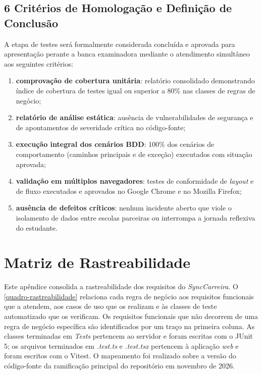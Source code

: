 \begin{apendicesenv}
\section*{6 Critérios de Homologação e Definição de Conclusão}

A etapa de testes será formalmente considerada concluída e aprovada para apresentação perante a banca examinadora mediante o atendimento simultâneo aos seguintes critérios:

\begin{enumerate}[label=\arabic*.]
  \item \textbf{comprovação de cobertura unitária}: relatório consolidado demonstrando índice de cobertura de testes igual ou superior a 80\% nas classes de regras de negócio;
  \item \textbf{relatório de análise estática}: ausência de vulnerabilidades de segurança e de apontamentos de severidade crítica no código-fonte;
  \item \textbf{execução integral dos cenários BDD}: 100\% dos cenários de comportamento (caminhos principais e de exceção) executados com situação aprovada;
  \item \textbf{validação em múltiplos navegadores}: testes de conformidade de \textit{layout} e de fluxo executados e aprovados no Google Chrome e no Mozilla Firefox;
  \item \textbf{ausência de defeitos críticos}: nenhum incidente aberto que viole o isolamento de dados entre escolas parceiras ou interrompa a jornada reflexiva do estudante.
\end{enumerate}

\chapter{Matriz de Rastreabilidade}\label{apendice-rastreabilidade}

Este apêndice consolida a rastreabilidade dos requisitos do \textit{SyncCarreira}. O \autoref{quadro-rastreabilidade} relaciona cada regra de negócio aos requisitos funcionais que a atendem, aos casos de uso que os realizam e às classes de teste automatizado que os verificam. Os requisitos funcionais que não decorrem de uma regra de negócio específica são identificados por um traço na primeira coluna. As classes terminadas em \textit{Tests} pertencem ao servidor e foram escritas com o JUnit 5; os arquivos terminados em \textit{.test.ts} e \textit{.test.tsx} pertencem à aplicação \textit{web} e foram escritos com o Vitest. O mapeamento foi realizado sobre a versão do código-fonte da ramificação principal do repositório em novembro de 2026.


\end{apendicesenv}

